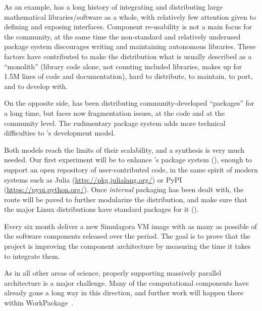 \begin{workpackage}[id=component-architecture,wphases=0-48!.5,
  title=Component Architecture,lead=UV,
  PSRM=64,UVRM=8,SARM=16, USHRM=4, USORM=6, UBRM=12]
\begin{tasklist}
\begin{task}[title=Modularization and packaging,id=mod-packaging,lead=UV,PM=32]
    As an example, \Sage has a long history of integrating and
    distributing large mathematical libraries/software as a whole,
    with relatively few attention given to defining and exposing
    interfaces. Component re-usability is not a main focus for the
    \Sage community, at the same time the non-standard and relatively
    underused package system discourages writing and maintaining
    autonomous libraries. These factors have contributed to make the
    \Sage distribution what is usually described as a ``monolith''
    (\Sage library code alone, not counting included libraries, makes
    up for 1.5M lines of code and documentation), hard to distribute,
    to maintain, to port, and to develop with.

    On the opposite side, \GAP has been distributing
    community-developed ``\GAP packages'' for a long time, but faces
    now fragmentation issues, at the code and at the community
    level. The rudimentary package system adds more technical
    difficulties to \GAP's development model.

    Both models reach the limits of their scalability, and a synthesis
    is very much needed.  Our first experiment will be to enhance
    \Sage's package system
    (), enough to
    support an open repository of user-contributed code, in the same
    spirit of modern systems such as Julia
    (\url{http://pkg.julialang.org/}) or PyPI
    (\url{https://pypi.python.org/}).  Once \emph{internal} packaging
    has been dealt with, the route will be paved to further modularize
    the \Sage distribution, and make sure that the major Linux
    distributions have standard packages for it
    ().

  \end{task}

\begin{task}[id=simulagora-dev,title=Simulagora integration,PM=4,lead=LL]
  Every six month deliver a new Simulagora VM image with as many as possible of the software
  components released over the period. The goal is to prove that the project is
  improving the component architecture by measuring the time it takes to
  integrate them.
\end{task}


  \begin{task}[title=Component architecture for High Performance Computing and Parallelism,id=component-for-HPC,PM=12]
    As in all other areas of science, properly supporting massively
    parallel architecture is a major challenge. Many of the
    computational components have already gone a long way in this
    direction, and further work will happen there within
    WorkPackage~.


\end{task}
\end{tasklist}
\end{workpackage}
